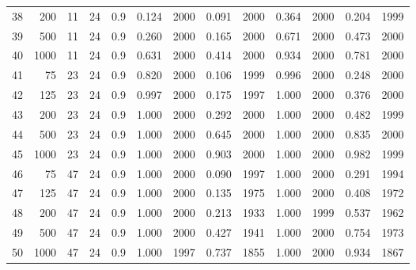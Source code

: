 \documentclass{article}
\begin{document}
\begin{table}[ht]
\begin{center}
\begin{tabular}{rrrrrrrrrrrrr}
  38 & 200 & 11 & 24 & 0.9 & 0.124 & 2000 & 0.091 & 2000 & 0.364 & 2000 & 0.204 & 1999 \\ 
  39 & 500 & 11 & 24 & 0.9 & 0.260 & 2000 & 0.165 & 2000 & 0.671 & 2000 & 0.473 & 2000 \\ 
  40 & 1000 & 11 & 24 & 0.9 & 0.631 & 2000 & 0.414 & 2000 & 0.934 & 2000 & 0.781 & 2000 \\ 
   \hline
41 & 75 & 23 & 24 & 0.9 & 0.820 & 2000 & 0.106 & 1999 & 0.996 & 2000 & 0.248 & 2000 \\ 
  42 & 125 & 23 & 24 & 0.9 & 0.997 & 2000 & 0.175 & 1997 & 1.000 & 2000 & 0.376 & 2000 \\ 
  43 & 200 & 23 & 24 & 0.9 & 1.000 & 2000 & 0.292 & 2000 & 1.000 & 2000 & 0.482 & 1999 \\ 
  44 & 500 & 23 & 24 & 0.9 & 1.000 & 2000 & 0.645 & 2000 & 1.000 & 2000 & 0.835 & 2000 \\ 
  45 & 1000 & 23 & 24 & 0.9 & 1.000 & 2000 & 0.903 & 2000 & 1.000 & 2000 & 0.982 & 1999 \\ 
   \hline
46 & 75 & 47 & 24 & 0.9 & 1.000 & 2000 & 0.090 & 1997 & 1.000 & 2000 & 0.291 & 1994 \\ 
  47 & 125 & 47 & 24 & 0.9 & 1.000 & 2000 & 0.135 & 1975 & 1.000 & 2000 & 0.408 & 1972 \\ 
  48 & 200 & 47 & 24 & 0.9 & 1.000 & 2000 & 0.213 & 1933 & 1.000 & 1999 & 0.537 & 1962 \\ 
  49 & 500 & 47 & 24 & 0.9 & 1.000 & 2000 & 0.427 & 1941 & 1.000 & 2000 & 0.754 & 1973 \\ 
  50 & 1000 & 47 & 24 & 0.9 & 1.000 & 1997 & 0.737 & 1855 & 1.000 & 2000 & 0.934 & 1867 \\ 
   \hline
\end{tabular}
\end{center}
\end{table}
\end{document}
